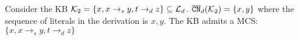






\begin{example}
\label{ex:de-logic}
Consider the KB $\mathcal{K}_2 = \{x, x \rightarrow_s y, t \rightarrow_d z \} \subseteq \mathcal{L}_d$. $\overline{\texttt{\textup{CN}}}_{d}(\mathcal{K}_2) = \{x, y\}$ where the sequence of literals in the derivation is $x, y$. The KB admits a MCS: $\{x, x \rightarrow_s y, t \rightarrow_d z \}$
\end{example}



